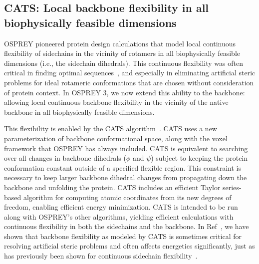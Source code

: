\subsection{CATS: Local backbone flexibility in all biophysically feasible dimensions}

OSPREY pioneered protein design calculations that model local continuous flexibility of sidechains in the vicinity of rotamers in all biophysically feasible dimensions (i.e., the sidechain dihedrals).  This continuous flexibility was often critical in finding optimal sequences~\cite{iMinDEE}, and especially in eliminating artificial steric problems for ideal rotameric conformations that are chosen without consideration of protein context.  In OSPREY 3, we now extend this ability to the backbone: allowing local continuous backbone flexibility in the vicinity of the native backbone in all biophysically feasible dimensions.  

This flexibility is enabled by the CATS algorithm~\cite{CATS}.  CATS uses a new parameterization of backbone conformational space, along with the voxel framework that OSPREY has always included.  CATS is equivalent to searching over all changes in backbone dihedrals ($\phi$ and $\psi$) subject to keeping the protein conformation constant outside of a specified flexible region.  This constraint is necessary to keep larger backbone dihedral changes from propagating down the backbone and unfolding the protein. CATS includes an efficient Taylor series-based algorithm for computing atomic coordinates from its new degrees of freedom, enabling efficient energy minimization.  CATS is intended to be run along with OSPREY's other algorithms, yielding efficient calculations with continuous flexibility in both the sidechains and the backbone.  In Ref~, we have shown that backbone flexibility as modeled by CATS is sometimes critical for resolving artificial steric problems and often affects energetics significantly, just as has previously been shown for continuous sidechain flexibility~\cite{iMinDEE}.  